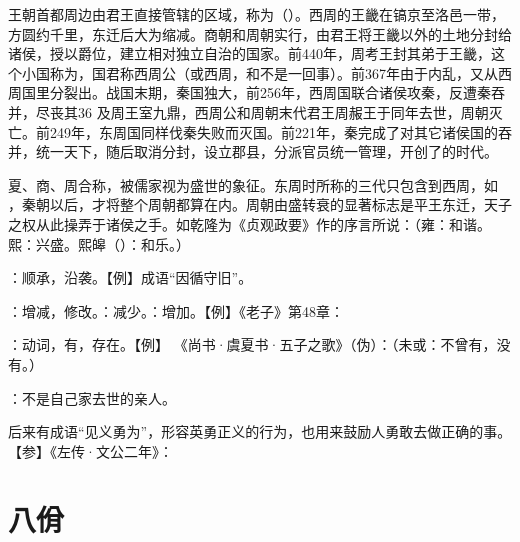 {
王朝首都周边由君王直接管辖的区域，称为（）。西周的王畿在镐京至洛邑一带，方圆约千里，东迁后大为缩减。商朝和周朝实行，由君王将王畿以外的土地分封给诸侯，授以爵位，建立相对独立自治的国家。前440年，周考王封其弟于王畿，这个小国称为，国君称西周公（或西周，和不是一回事）。前367年由于内乱，又从西周国里分裂出。战国末期，秦国独大，前256年，西周国联合诸侯攻秦，反遭秦吞并，尽丧其36 及周王室九鼎，西周公和周朝末代君王周赧王于同年去世，周朝灭亡。前249年，东周国同样伐秦失败而灭国。前221年，秦完成了对其它诸侯国的吞并，统一天下，随后取消分封，设立郡县，分派官员统一管理，开创了的时代。

夏、商、周合称，被儒家视为盛世的象征。东周时所称的三代只包含到西周，如 ，秦朝以后，才将整个周朝都算在内。周朝由盛转衰的显著标志是平王东迁，天子之权从此操弄于诸侯之手。如乾隆为《贞观政要》作的序言所说：（雍：和谐。熙：兴盛。熙皞（）：和乐。）

\item {}：顺承，沿袭。【例】成语“因循守旧”。

\item {}：增减，修改。：减少。：增加。【例】《老子》第48章：

\item {}：动词，有，存在。【例】 《尚书·虞夏书·五子之歌》（伪）：（未或：不曾有，没有。）
}
{}  %


{
\item {}：不是自己家去世的亲人。
\item {}后来有成语“见义勇为”，形容英勇正义的行为，也用来鼓励人勇敢去做正确的事。【参】《左传·文公二年》：
}
{}



\chapter{八佾}

